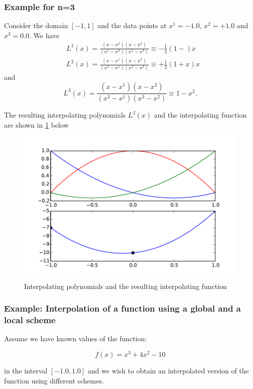 \subsubsection*{Example for n=3}
Consider the domain $[ - 1,1]$ and the data points at ${x^1} =  - 1.0$, ${x^2} =  + 1.0$ and ${x^3} = 0.0$. We have
\begin{align*}
& L^1(x) = \frac{(x - x^2)(x - x^3)}{(x^1 - x^2)(x^1-x^3)} \equiv  - \frac{1}{2}(1 - )x\\
& L^2(x) = \frac{(x - x^1)(x - x^3)}{(x^2 - x^1)(x^2 - x^3)} \equiv  + \frac{1}{2}(1 + x)x
\end{align*}
and
\[L^3(x) = \frac{(x - x^1)(x - x^2)}{(x^3 - x^1)(x^3 - x^2)} \equiv 1 - x^2.\]

The resulting interpolating polynomials $L^I(x)$ and the interpolating function  are shown in \cref{fig:pols} below
\begin{figure}[H]
  \centering
  \includegraphics[width=16cm]{func.pdf}
  \caption{Interpolating polynomials and the resulting interpolating function}
  \label{fig:pols}
\end{figure}

\subsubsection*{Example: Interpolation of a function using a global and a local scheme}
Assume we have known values of the function:

\[f(x) = {x^3} + 4{x^2} - 10\]

in the interval $[-1.0, 1.0]$ and we wish to obtain an interpolated version of the function using different schemes.


